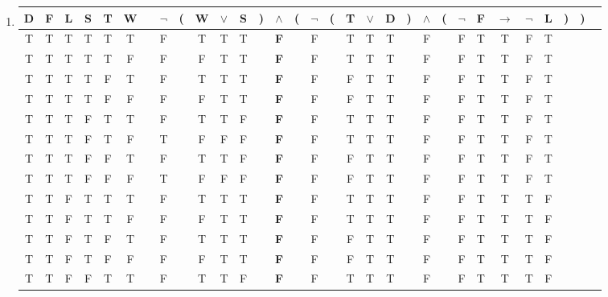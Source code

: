 \begin{enumerate}
\item
\begin{tabular}{@{ }c@{ }@{ }c@{ }@{ }c@{ }@{ }c@{ }@{ }c@{ }@{ }c | c@{ }@{ }c@{ }@{}c@{}@{ }c@{ }@{ }c@{ }@{ }c@{ }@{}c@{}@{ }c@{ }@{}c@{}@{ }c@{ }@{}c@{}@{ }c@{ }@{ }c@{ }@{ }c@{ }@{}c@{}@{ }c@{ }@{}c@{}@{ }c@{ }@{ }c@{ }@{ }c@{ }@{ }c@{ }@{ }c@{ }@{}c@{}@{}c@{}@{ }c}
D & F & L & S & T & W &  & $\lnot$ & ( & W & $\lor$ & S & ) & $\land$ & ( & $\lnot$ & ( & T & $\lor$ & D & ) & $\land$ & ( & $\lnot$ & F & $\rightarrow$ & $\lnot$ & L & ) & ) & \\
\hline
T & T & T & T & T & T &  & F &  & T & T & T &  & \textbf{F} &  & F &  & T & T & T &  & F &  & F & T & T & F & T &  &  & \\
T & T & T & T & T & F &  & F &  & F & T & T &  & \textbf{F} &  & F &  & T & T & T &  & F &  & F & T & T & F & T &  &  & \\
T & T & T & T & F & T &  & F &  & T & T & T &  & \textbf{F} &  & F &  & F & T & T &  & F &  & F & T & T & F & T &  &  & \\
T & T & T & T & F & F &  & F &  & F & T & T &  & \textbf{F} &  & F &  & F & T & T &  & F &  & F & T & T & F & T &  &  & \\
T & T & T & F & T & T &  & F &  & T & T & F &  & \textbf{F} &  & F &  & T & T & T &  & F &  & F & T & T & F & T &  &  & \\
T & T & T & F & T & F &  & T &  & F & F & F &  & \textbf{F} &  & F &  & T & T & T &  & F &  & F & T & T & F & T &  &  & \\
T & T & T & F & F & T &  & F &  & T & T & F &  & \textbf{F} &  & F &  & F & T & T &  & F &  & F & T & T & F & T &  &  & \\
T & T & T & F & F & F &  & T &  & F & F & F &  & \textbf{F} &  & F &  & F & T & T &  & F &  & F & T & T & F & T &  &  & \\
T & T & F & T & T & T &  & F &  & T & T & T &  & \textbf{F} &  & F &  & T & T & T &  & F &  & F & T & T & T & F &  &  & \\
T & T & F & T & T & F &  & F &  & F & T & T &  & \textbf{F} &  & F &  & T & T & T &  & F &  & F & T & T & T & F &  &  & \\
T & T & F & T & F & T &  & F &  & T & T & T &  & \textbf{F} &  & F &  & F & T & T &  & F &  & F & T & T & T & F &  &  & \\
T & T & F & T & F & F &  & F &  & F & T & T &  & \textbf{F} &  & F &  & F & T & T &  & F &  & F & T & T & T & F &  &  & \\
T & T & F & F & T & T &  & F &  & T & T & F &  & \textbf{F} &  & F &  & T & T & T &  & F &  & F & T & T & T & F &  &  & \\

\end{tabular}
\end{enumerate}
